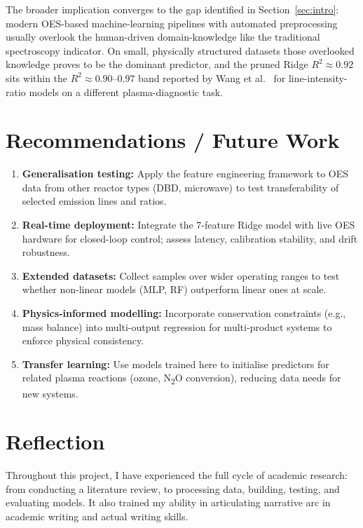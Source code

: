 \documentclass[12pt, a4paper]{article}
\begin{document}
The broader implication converges to the gap identified in Section~\ref{sec:intro}: modern OES-based machine-learning pipelines with automated preprocessing usually overlook the human-driven domain-knowledge like the traditional spectroscopy indicator. On small, physically structured datasets those overlooked knowledge proves to be the dominant predictor, and the pruned Ridge $R^2 \approx 0.92$ sits within the $R^2 \approx 0.90\text{--}0.97$ band reported by Wang et al.~\cite{Wang2025MLOESCascaded} for line-intensity-ratio models on a different plasma-diagnostic task. 

\newpage
\section{Recommendations / Future Work}
\label{sec:future}

\begin{enumerate}[noitemsep, topsep=0pt]
    \item \textbf{Generalisation testing:} Apply the feature engineering framework to OES data from other reactor types (DBD, microwave) to test transferability of selected emission lines and ratios.
    \item \textbf{Real-time deployment:} Integrate the 7-feature Ridge model with live OES hardware for closed-loop control; assess latency, calibration stability, and drift robustness.
    \item \textbf{Extended datasets:} Collect samples over wider operating ranges to test whether non-linear models (MLP, RF) outperform linear ones at scale.
    \item \textbf{Physics-informed modelling:} Incorporate conservation constraints (e.g., mass balance) into multi-output regression for multi-product systems to enforce physical consistency.
    \item \textbf{Transfer learning:} Use models trained here to initialise predictors for related plasma reactions (ozone, N\textsubscript{2}O conversion), reducing data needs for new systems.
\end{enumerate}

\newpage
\section{Reflection}
\label{sec:reflection}


Throughout this project, I have experienced the full cycle of academic research: from conducting a literature review, to processing data, building, testing, and evaluating models. It also trained my ability in articulating narrative arc in academic writing and actual writing skills.  
\end{document}
